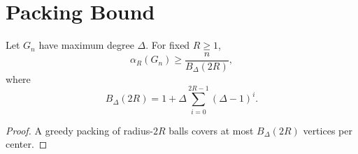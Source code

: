 \section{Packing Bound}

\begin{lemma}
Let $G_n$ have maximum degree $\Delta$. For fixed $R\ge1$,
\[
\alpha_R(G_n) \ge \frac{n}{B_\Delta(2R)},
\]
where
\[
B_\Delta(2R)=1+\Delta\sum_{i=0}^{2R-1}(\Delta-1)^i.
\]
\end{lemma}

\begin{proof}
A greedy packing of radius-$2R$ balls covers at most $B_\Delta(2R)$ vertices per center.
\end{proof}
